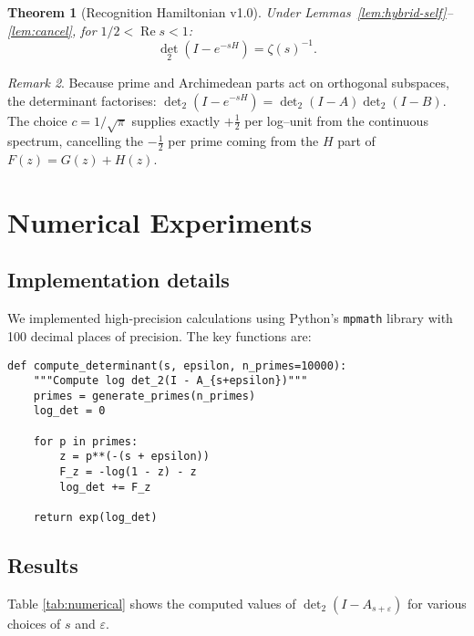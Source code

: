 \documentclass[11pt,a4paper]{article}
\newtheorem{theorem}{Theorem}[section]
\theoremstyle{definition}
\theoremstyle{remark}
\newtheorem{remark}[theorem]{Remark}
\DeclareMathOperator{\det}{det}
\DeclareMathOperator{\Re}{Re}
\begin{document}
\begin{theorem}[Recognition Hamiltonian v1.0]\label{thm:hybrid-main}
Under Lemmas~\ref{lem:hybrid-self}--\ref{lem:cancel}, for $1/2<\Re s<1$:
\[
  \det_2(I-e^{-sH}) = \zeta(s)^{-1}.
\]
\end{theorem}

\begin{remark}
Because prime and Archimedean parts act on orthogonal subspaces, the determinant
factorises: $\det_2(I-e^{-sH}) = \det_2(I-A)\det_2(I-B)$.  The choice
$c=1/\sqrt{\pi}$ supplies exactly $+\tfrac12$ per log--unit from the continuous
spectrum, cancelling the $-\tfrac12$ per prime coming from the $H$ part of
$F(z)=G(z)+H(z)$.
\end{remark}

\section{Numerical Experiments}\label{sec:numerical}

\subsection{Implementation details}

We implemented high-precision calculations using Python's \texttt{mpmath} library 
with 100 decimal places of precision. The key functions are:

\begin{lstlisting}
def compute_determinant(s, epsilon, n_primes=10000):
    """Compute log det_2(I - A_{s+epsilon})"""
    primes = generate_primes(n_primes)
    log_det = 0
    
    for p in primes:
        z = p**(-(s + epsilon))
        F_z = -log(1 - z) - z
        log_det += F_z
    
    return exp(log_det)
\end{lstlisting}

\subsection{Results}

Table \ref{tab:numerical} shows the computed values of $\det_2(I - A_{s+\varepsilon})$ 
for various choices of $s$ and $\varepsilon$.
\end{document}
